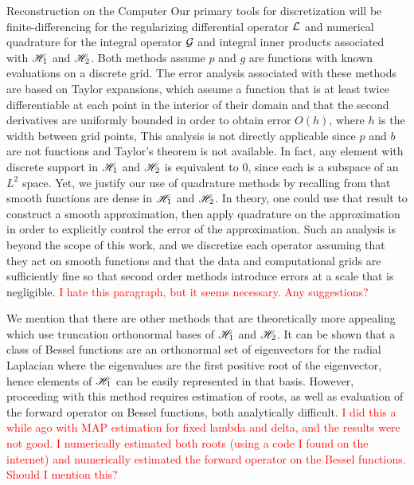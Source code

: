 \begin{chapter}{Reconstruction on the Computer}
Our primary tools for discretization will be finite-differencing for the regularizing differential operator $\mathcal L$ and numerical quadrature for the integral operator $\mathcal G$ and integral inner products associated with $\mathscr H_1$ and $\mathscr H_2$.
Both methods assume $p$ and $g$ are functions with known evaluations on a discrete grid.
The error analysis associated with these methods are based on Taylor expansions, which assume a function that is at least twice differentiable at each point in the interior of their domain and that the second derivatives are uniformly bounded in order to obtain error $O(h)$, where $h$ is the width between grid points,
This analysis is not directly applicable since $p$ and $b$ are not functions and Taylor's theorem is not available.
In fact, any element with discrete support in $\mathscr H_1$ and $\mathscr H_2$ is equivalent to $0$, since each is a subspace of an $L^2$ space.
Yet, we justify our use of quadrature methods by recalling from  that smooth functions are dense in $\mathscr H_1$ and $\mathscr H_2$.
In theory, one could use that result to construct a smooth approximation, then apply quadrature on the approximation in order to explicitly control the error of the approximation.
Such an analysis is beyond the scope of this work, and we discretize each operator assuming that they act on smooth functions and that the data and computational grids are sufficiently fine so that second order methods introduce errors at a scale that is negligible.
\textcolor{red}{
  I hate this paragraph, but it seems necessary. Any suggestions?
}

We mention that there are other methods that are theoretically more appealing which use truncation orthonormal bases of $\mathscr H _1$ and $\mathscr H_2$.
It can be shown that a class of Bessel functions are an orthonormal set of eigenvectors for the radial Laplacian where the eigenvalues are the first positive root of the eigenvector, hence elements of $\mathscr H_1$ can be easily represented in that basis.
However, proceeding with this method requires estimation of roots, as well as evaluation of the forward operator on Bessel functions, both analytically difficult.
\textcolor{red}{
  I did this a while ago with MAP estimation for fixed lambda and delta, and the results were not good. I numerically estimated both roots (using a code I found on the internet) and numerically estimated the forward operator on the Bessel functions.
  Should I mention this?
}


\end{chapter}
